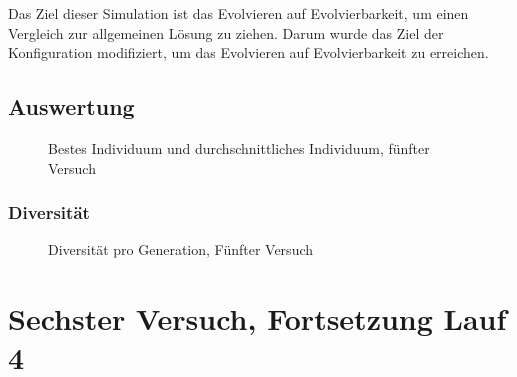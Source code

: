       Das Ziel dieser Simulation ist das Evolvieren auf Evolvierbarkeit,
      um einen Vergleich zur allgemeinen Lösung zu ziehen.
      Darum wurde das Ziel der Konfiguration modifiziert, um das Evolvieren auf Evolvierbarkeit zu erreichen.

    \subsection{Auswertung\label{sub:fifthAuswertung}}

      \begin{figure}[H]
        \centering
        
        \caption{Bestes Individuum und durchschnittliches Individuum, fünfter Versuch\label{fig:graphFifth}}
      \end{figure}

      \subsubsection{Diversität}

        \begin{figure}[H]
          \centering
          
          \caption{Diversität pro Generation, Fünfter Versuch\label{fig:graphDivFifth}}

        \end{figure}

  \section{Sechster Versuch, Fortsetzung Lauf 4\label{sec:sixthSimulation}}
